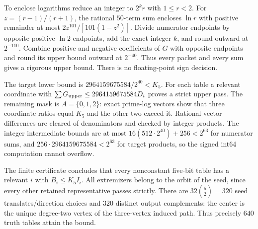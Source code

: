 \documentclass{article}
\begin{document}
To enclose logarithms reduce an integer to $2^k r$ with $1\le r<2$.
For $z=(r-1)/(r+1)$, the rational $50$-term sum encloses $\ln r$ with
positive remainder at most $2z^{101}/[101(1-z^2)]$.
Divide numerator endpoints by opposite positive $\ln2$ endpoints, add the
exact integer $k$, and round outward at $2^{-110}$. Combine positive and
negative coefficients of $G$ with opposite endpoints and round its upper
bound outward at $2^{-40}$. Thus every packet and every sum gives a rigorous
upper bound. There is no floating-point sign decision.

The target lower bound is $2964159675584/2^{40}<K_5$.
For each table a relevant coordinate with
$\sum G_{\rm upper}\le2964159675584 D_i$ proves a strict upper pass.
The remaining mask is $A=\{0,1,2\}$: exact prime-log vectors show that three
coordinate ratios equal $K_5$ and the other two exceed it. Rational vector
differences are cleared of denominators and checked by integer products.
The integer intermediate bounds are at most
$16(512\cdot2^{40})+256<2^{63}$ for numerator sums, and
$256\cdot2964159675584<2^{63}$ for target products, so the signed int64
computation cannot overflow.

The finite certificate concludes that every nonconstant five-bit table has
a relevant $i$ with $B_i\le K_5 I_i$. All extremizers belong to the orbit of
the seed, since every other retained representative passes strictly.
There are $32\binom52=320$ seed translates/direction choices and $320$
distinct output complements: the center is the unique degree-two vertex of
the three-vertex induced path. Thus precisely $640$ truth tables attain the bound.
\end{document}

